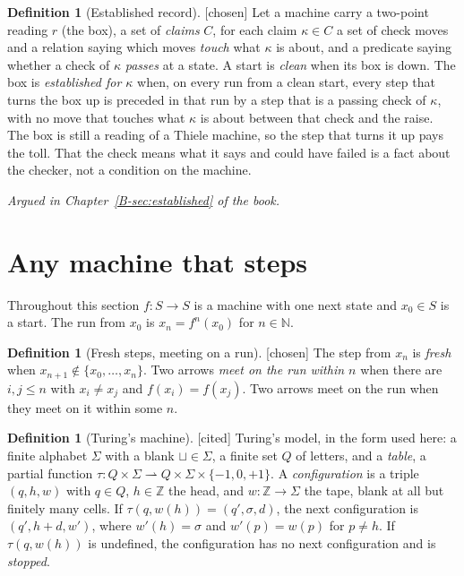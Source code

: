 \documentclass[11pt, a4paper]{article}
\theoremstyle{plain}
\theoremstyle{definition}
\newtheorem{definition}[theorem]{Definition}
\theoremstyle{remark}
\newcommand{\N}{\mathbb{N}}
\newcommand{\Z}{\mathbb{Z}}
\newcommand{\rd}{r}
\newcommand{\argued}[1]{\par\noindent\textit{Argued in Chapter~\ref{B-#1} of the book.}\par}
\newcommand{\kind}[1]{\textup{[#1]}}
\begin{document}
\begin{definition}[Established record]\label{def:established} \kind{chosen}
Let a machine carry a two-point reading $\rd$ (the box), a set of \emph{claims} $C$, for each claim
$\kappa\in C$ a set of check moves and a relation saying which moves \emph{touch} what $\kappa$ is about,
and a predicate saying whether a check of $\kappa$ \emph{passes} at a state. A start is \emph{clean} when
its box is down. The box is \emph{established for $\kappa$} when, on every run from a clean start, every
step that turns the box up is preceded in that run by a step that is a passing check of $\kappa$, with no
move that touches what $\kappa$ is about between that check and the raise. The box is still a reading of
a Thiele machine, so the step that turns it up pays the toll. That the check means what it says
and could have failed is a fact about the checker, not a condition on the machine.
\end{definition}

\argued{sec:established}
\section{Any machine that steps}\label{spec:ch01}

Throughout this section $f:S\to S$ is a machine with one next state and $x_0\in S$ is a start. The run
from $x_0$ is $x_n=f^n(x_0)$ for $n\in\N$.

\begin{definition}[Fresh steps, meeting on a run]\label{spec:fresh} \kind{chosen}
The step from $x_n$ is \emph{fresh} when $x_{n+1}\notin\{x_0,\dots,x_n\}$. Two arrows \emph{meet on the
run within $n$} when there are $i,j\le n$ with $x_i\ne x_j$ and $f(x_i)=f(x_j)$. Two arrows meet on the
run when they meet on it within some $n$.
\end{definition}

\begin{definition}[Turing's machine]\label{spec:turing} \kind{cited}
Turing's model, in the form used here: a finite alphabet $\Sigma$ with a blank $\sqcup\in\Sigma$, a
finite set $Q$ of letters, and a \emph{table}, a partial function
$\tau:Q\times\Sigma\rightharpoonup Q\times\Sigma\times\{-1,0,+1\}$. A \emph{configuration} is a triple
$(q,h,w)$ with $q\in Q$, $h\in\Z$ the head, and $w:\Z\to\Sigma$ the tape, blank at all but finitely many
cells. If $\tau(q,w(h))=(q',\sigma,d)$, the next configuration is $(q',h+d,w')$, where $w'(h)=\sigma$ and
$w'(p)=w(p)$ for $p\ne h$. If $\tau(q,w(h))$ is undefined, the configuration has no next configuration
and is \emph{stopped}.
\end{definition}
\end{document}
